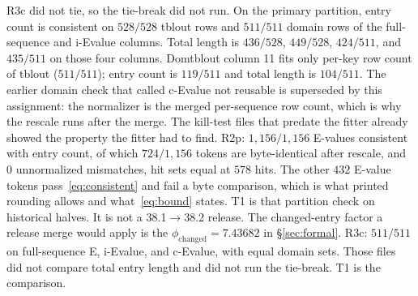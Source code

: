 \documentclass[letterpaper,twocolumn,10pt]{article}
\begin{document}
R3c did not tie, so the tie-break did not run.
On the primary partition, entry count is consistent on
$528/528$
tblout rows and
$511/511$
domain rows of the full-sequence and i-Evalue columns.
Total length is
$436/528$,
$449/528$,
$424/511$,
and
$435/511$
on those four columns.
Domtblout column 11 fits only per-key row count of tblout
($511/511$);
entry count is
$119/511$
and total length is
$104/511$.
The earlier domain check that called c-Evalue not reusable is superseded by this assignment: the normalizer is the merged per-sequence row count, which is why the rescale runs after the merge.
The kill-test files that predate the fitter already showed the property the fitter had to find.
R2p:
$1{,}156/1{,}156$
E-values consistent with entry count, of which
$724/1{,}156$
tokens are byte-identical after rescale, and
$0$
unnormalized mismatches, hit sets equal at
$578$
hits.
The other
$432$
E-value tokens pass~\eqref{eq:consistent} and fail a byte comparison, which is what printed rounding allows and what~\eqref{eq:bound} states.
T1 is that partition check on historical halves.
It is not a 38.1$\to$38.2 release.
The changed-entry factor a release merge would apply is the $\phi_{\mathrm{changed}} = 7.43682$ in \S\ref{sec:formal}.
R3c:
$511/511$
on full-sequence E, i-Evalue, and c-Evalue, with equal domain sets.
Those files did not compare total entry length and did not run the tie-break.
T1 is the comparison.
\end{document}
